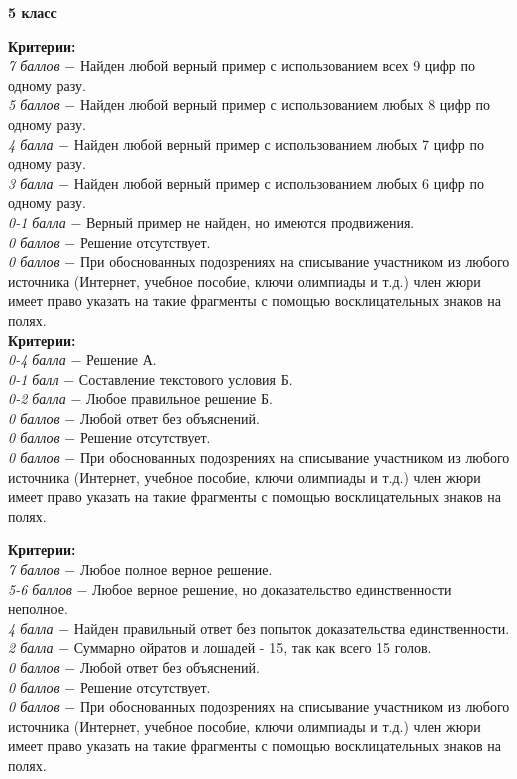 \centerline{\bf \Huge 5 класс}

 \textbf{Критерии:} \\
\textit{7 баллов} $-$ Найден любой верный пример с использованием всех 9 цифр по одному разу.\\
\textit{5 баллов} $-$ Найден любой верный пример с использованием любых 8 цифр по одному разу.\\
\textit{4 балла} $-$ Найден любой верный пример с использованием любых 7 цифр по одному разу.\\
\textit{3 балла} $-$ Найден любой верный пример с использованием любых 6 цифр по одному разу.\\
\textit{0-1 балла} $-$ Верный пример не найден, но имеются продвижения.\\
\textit{0 баллов} $-$ Решение отсутствует.\\
\textit{0 баллов} $-$ При обоснованных подозрениях на списывание участником из любого источника (Интернет, учебное пособие, ключи олимпиады и т.д.) член жюри имеет право указать на такие фрагменты с помощью восклицательных знаков на полях. \\

 \textbf{Критерии:} \\
\textit{0-4 балла} $-$ Решение А.\\
\textit{0-1 балл} $-$ Составление текстового условия Б.\\
\textit{0-2 балла} $-$ Любое правильное решение Б.\\
\textit{0 баллов} $-$ Любой ответ без объяснений.\\
\textit{0 баллов} $-$ Решение отсутствует.\\
\textit{0 баллов} $-$ При обоснованных подозрениях на списывание участником из любого источника (Интернет, учебное пособие, ключи олимпиады и т.д.) член жюри имеет право указать на такие фрагменты с помощью восклицательных знаков на полях. \\

\newpage

 \textbf{Критерии:} \\
\textit{7 баллов} $-$ Любое полное верное решение.\\
\textit{5-6 баллов} $-$ Любое верное решение, но доказательство единственности неполное.\\
\textit{4 балла} $-$ Найден правильный ответ без попыток доказательства единственности.\\
\textit{2 балла} $-$ Суммарно ойратов и лошадей - 15, так как всего 15 голов.\\
\textit{0 баллов} $-$ Любой ответ без объяснений.\\
\textit{0 баллов} $-$ Решение отсутствует.\\
\textit{0 баллов} $-$ При обоснованных подозрениях на списывание участником из любого источника (Интернет, учебное пособие, ключи олимпиады и т.д.) член жюри имеет право указать на такие фрагменты с помощью восклицательных знаков на полях. \\


